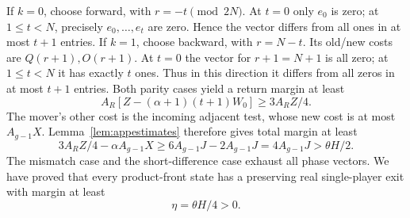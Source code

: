 \documentclass[manuscript,review,anonymous]{acmart}
\begin{document}
If $k=0$, choose forward, with $r=-t\pmod{2N}$. At $t=0$ only $e_0$ is zero; at $1\le t<N$, precisely $e_0,\ldots,e_t$ are zero. Hence the vector differs from all ones in at most $t+1$ entries. If $k=1$, choose backward, with $r=N-t$. Its old/new costs are $Q(r+1),O(r+1)$. At $t=0$ the vector for $r+1=N+1$ is all zero; at $1\le t<N$ it has exactly $t$ ones. Thus in this direction it differs from all zeros in at most $t+1$ entries. Both parity cases yield a return margin at least
\begin{equation}\label{eq:appreturnmargin}
 A_R[Z-(\alpha+1)(t+1)W_0]\ge3A_RZ/4.
\end{equation}
The mover's other cost is the incoming adjacent test, whose new cost is at most $A_{g-1}X$. Lemma~\ref{lem:appestimates} therefore gives total margin at least
\begin{equation}\label{eq:appfinalfrontmargin}
 3A_RZ/4-\alpha A_{g-1}X
 \ge6A_{g-1}J-2A_{g-1}J
 =4A_{g-1}J>\theta H/2.
\end{equation}
The mismatch case and the short-difference case exhaust all phase vectors. We have proved that every product-front state has a preserving real single-player exit with margin at least
\begin{equation}\label{eq:appeta}
 \eta=\theta H/4>0.
\end{equation}
\end{document}
